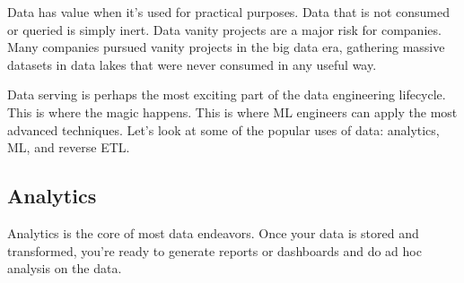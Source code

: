Data has value when it's used for practical purposes. Data that is not consumed or
queried is simply inert. Data vanity projects are a major risk for companies. Many
companies pursued vanity projects in the big data era, gathering massive datasets in
data lakes that were never consumed in any useful way.

Data serving is perhaps the most exciting part of the data engineering lifecycle. This
is where the magic happens. This is where ML engineers can apply the most advanced
techniques. Let's look at some of the popular uses of data: analytics, ML, and reverse
ETL.


\subsection*{Analytics}
Analytics is the core of most data endeavors. Once your data is stored and transformed,
you're ready to generate reports or dashboards and do ad hoc analysis on the
data.

